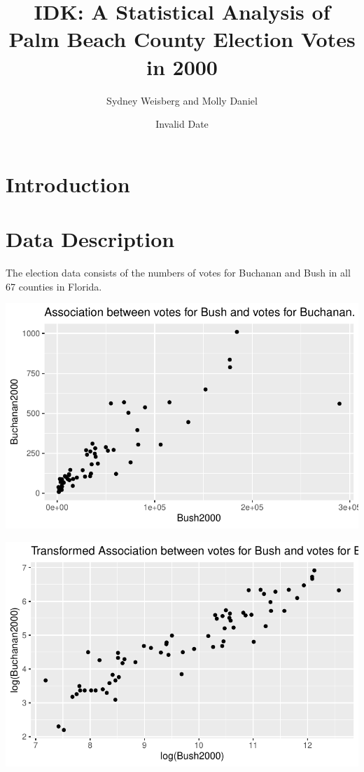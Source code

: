 \documentclass[
  letterpaper,
  DIV=11,
  numbers=noendperiod]{scrartcl}
\title{IDK: A Statistical Analysis of Palm Beach County Election Votes
in 2000}
\author{Sydney Weisberg and Molly Daniel}
\date{Invalid Date}
\begin{document}
\maketitle


\section{Introduction}\label{introduction}

\section{Data Description}\label{data-description}

The election data consists of the numbers of votes for Buchanan and Bush
in all 67 counties in Florida.

\includegraphics{case_study_1_files/figure-pdf/warning-FALSE-1.pdf}

\includegraphics{case_study_1_files/figure-pdf/warning-FALSE-2.pdf}
\end{document}
